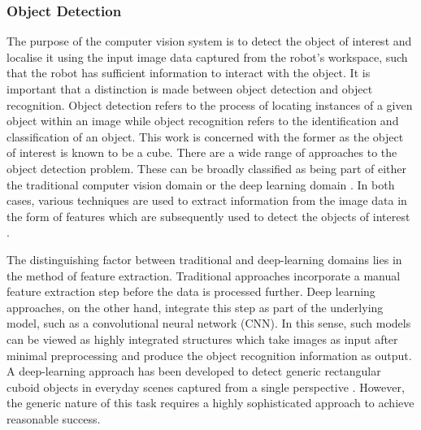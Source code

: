 



\subsubsection{Object Detection}


The purpose of the computer vision system is to detect the object of interest and localise it using the input image data captured from the robot's workspace, such that the robot has sufficient information to interact with the object. It is important that a distinction is made between object detection and object recognition. Object detection refers to the process of locating instances of a given object within an image while object recognition refers to the identification and classification of an object. This work is concerned with the former as the object of interest is known to be a cube. There are a wide range of approaches to the object detection problem. These can be broadly classified as being part of either the traditional computer vision domain or the deep learning domain \cite{MathWorks:Object_Recognition}. In both cases, various techniques are used to extract information from the image data in the form of features which are subsequently used to detect the objects of interest \cite{Kumar:Visual_Servoing}. 

The distinguishing factor between traditional and deep-learning domains lies in the method of feature extraction. Traditional approaches incorporate a manual feature extraction step before the data is processed further. Deep learning approaches, on the other hand, integrate this step as part of the underlying model, such as a convolutional neural network (CNN). In this sense, such models can be viewed as highly integrated structures which take images as input after minimal preprocessing and produce the object recognition information as output. A deep-learning approach has been developed to detect generic rectangular cuboid objects in everyday scenes captured from a single perspective \cite{Xiao:Localizing_3D_Cuboids}. However, the generic nature of this task requires a highly sophisticated approach to achieve reasonable success. 



